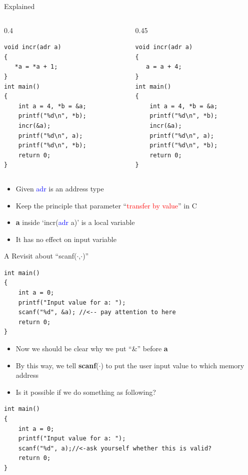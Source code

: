 \begin{frame}[fragile]{Explained}
\vspace{-0.03in}
\begin{columns}
\begin{column}{0.4\linewidth}
\begin{lstlisting}
void incr(adr a)
{
   *a = *a + 1;
}
int main()
{
	int a = 4, *b = &a;
	printf("%d\n", *b);
	incr(&a);
	printf("%d\n", a);
	printf("%d\n", *b);
	return 0;
}
\end{lstlisting}
\end{column}
\begin{column}{0.45\linewidth}
\begin{lstlisting}
void incr(adr a)
{
   a = a + 4;
}
int main()
{
	int a = 4, *b = &a;
	printf("%d\n", *b);
	incr(&a);
	printf("%d\n", a);
	printf("%d\n", *b);
	return 0;
}
\end{lstlisting}
\end{column}
\end{columns}
\begin{itemize}
	\item {Given \textcolor{blue}{adr} is an address type}
    \item {Keep the principle that parameter ``\textcolor{red}{transfer by value}'' in C}
    \item {\textbf{a} inside `incr(\textcolor{blue}{adr} a)' is a local variable}
    \item {It has no effect on input variable}
\end{itemize}
\end{frame}

\begin{frame}[fragile]{A Revisit about ``scanf($\cdot$,$\cdot$)''}
\vspace{-0.03in}
\begin{lstlisting}[xleftmargin=0.08\linewidth, linewidth=0.9\linewidth]
int main()
{
	int a = 0;
	printf("Input value for a: ");
	scanf("%d", &a); //<-- pay attention to here
	return 0;
}
\end{lstlisting}
\vspace{-0.03in}
\begin{itemize}
	\item {Now we should be clear why we put ``\&'' before \textbf{a}}
	\item {By this way, we tell \textbf{scanf}($\cdot$) to put the user input value to which memory address}
	\item {Is it possible if we do something as following?}
\end{itemize}
\begin{lstlisting}[xleftmargin=0.01\linewidth, linewidth=0.99\linewidth]
int main()
{
	int a = 0;
	printf("Input value for a: ");
	scanf("%d", a);//<-ask yourself whether this is valid?
	return 0;
}
\end{lstlisting}
\end{frame}